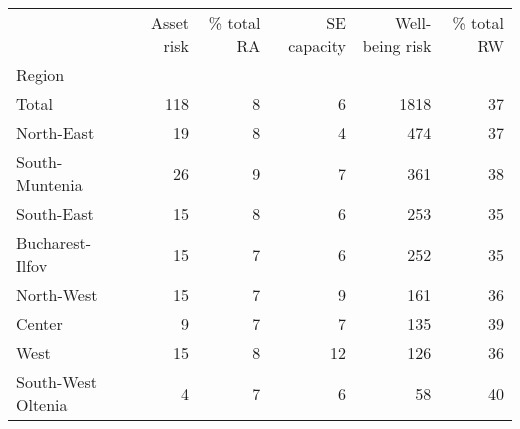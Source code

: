 \begin{tabular}{lrrrrr}
\toprule
{} &  Asset risk &  \% total RA &  SE capacity &  Well-being risk &  \% total RW \\
Region             &             &             &              &                  &             \\
\midrule
Total              &         118 &           8 &            6 &             1818 &          37 \\
North-East         &          19 &           8 &            4 &              474 &          37 \\
South-Muntenia     &          26 &           9 &            7 &              361 &          38 \\
South-East         &          15 &           8 &            6 &              253 &          35 \\
Bucharest-Ilfov    &          15 &           7 &            6 &              252 &          35 \\
North-West         &          15 &           7 &            9 &              161 &          36 \\
Center             &           9 &           7 &            7 &              135 &          39 \\
West               &          15 &           8 &           12 &              126 &          36 \\
South-West Oltenia &           4 &           7 &            6 &               58 &          40 \\
\bottomrule
\end{tabular}
